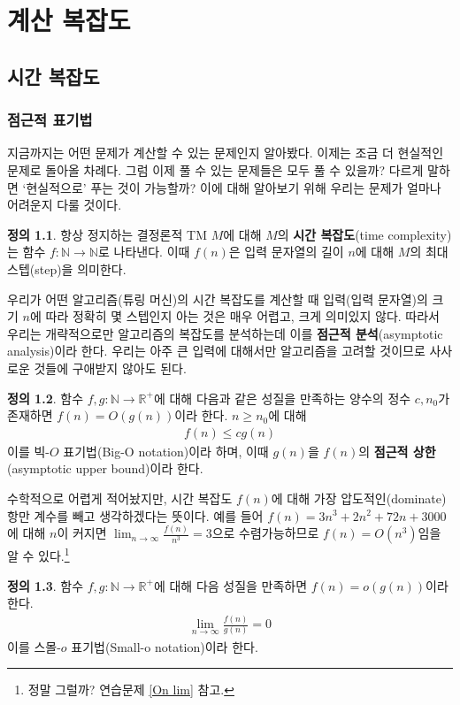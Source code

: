 \documentclass[b5paper, 11pt]{book}
\theoremstyle{definition}
\newtheorem{defn}{정의}[chapter]
\begin{document}
\part{계산 복잡도}
\chapter{시간 복잡도}
\section{점근적 표기법}\label{asymptotic}
지금까지는 어떤 문제가 계산할 수 있는 문제인지 알아봤다. 이제는 조금 더 현실적인 문제로 돌아올 차례다. 그럼 이제 풀 수 있는 문제들은 모두 풀 수 있을까? 다르게 말하면 `현실적으로' 푸는 것이 가능할까? 이에 대해 알아보기 위해 우리는 문제가 얼마나 어려운지 다룰 것이다.
\begin{defn}
    항상 정지하는 결정론적 TM $M$에 대해 $M$의 \textbf{시간 복잡도}(time complexity)는 함수 $f: \mathbb{N} \rightarrow \mathbb{N}$로 나타낸다. 이때 $f(n)$은 입력 문자열의 길이 $n$에 대해 $M$의 최대 스텝(step)을 의미한다.
\end{defn}
우리가 어떤 알고리즘(튜링 머신)의 시간 복잡도를 계산할 때 입력(입력 문자열)의 크기 $n$에 따라 정확히 몇 스텝인지 아는 것은 매우 어렵고, 크게 의미있지 않다. 따라서 우리는 개략적으로만 알고리즘의 복잡도를 분석하는데 이를 \textbf{점근적 분석}(asymptotic analysis)이라 한다. 우리는 아주 큰 입력에  대해서만 알고리즘을 고려할 것이므로 사사로운 것들에 구애받지 않아도 된다. 
\begin{defn} \label{big-o defn}
    함수 $f, g : \mathbb{N} \rightarrow \mathbb{R}^{+}$에 대해 다음과 같은 성질을 만족하는 양수의 정수 $c, n_0$가 존재하면 $f(n) = O(g(n))$이라 한다. $n \ge n_0$에 대해
    \begin{align*}
        f(n) \le cg(n)
    \end{align*}
    이를 빅-$O$ 표기법(Big-O notation)이라 하며, 이때 $g(n)$을 $f(n)$의 \textbf{점근적 상한} (asymptotic upper bound)이라 한다.
\end{defn}
수학적으로 어렵게 적어놨지만, 시간 복잡도 $f(n)$에 대해 가장 압도적인(dominate) 항만 계수를 빼고 생각하겠다는 뜻이다. 예를 들어 $f(n) = 3n^3 + 2n^2 +72n + 3000$에 대해 $n$이 커지면 $\lim_{n \rightarrow \infty} 
\frac{f(n)}{n^3} = 3$으로 수렴가능하므로 $f(n) = O(n^3)$임을 알 수 있다.\footnote{정말 그럴까? 연습문제 \ref{On lim} 참고.}
\begin{defn}\label{small-o defn}
    함수 $f,g : \mathbb{N} \rightarrow \mathbb{R}^{+}$에 대해 다음 성질을 만족하면 $f(n) = o(g(n))$이라 한다. 
    \begin{align*}
        \lim_{n\rightarrow \infty} \frac{f(n)}{g(n)} = 0
    \end{align*}
    이를 스몰-$o$ 표기법(Small-o notation)이라 한다. 
\end{defn}
\end{document}
